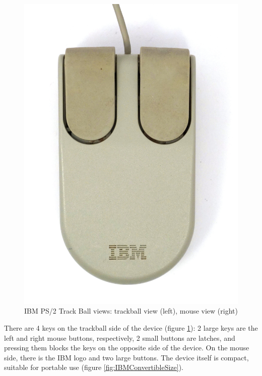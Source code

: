 \documentclass[11pt, a4paper]{article}
\begin{document}
\begin{figure}[h]
    \includegraphics[scale=0.5]{1992_ibm_convertible/bottom_60.jpg}
    \caption{IBM PS/2 Track Ball views: trackball view (left), mouse view (right)}
    \label{fig:IBMConvertibleTopAndBottom}
\end{figure}

There are 4 keys on the trackball side of the device (figure \ref{fig:IBMConvertibleTopAndBottom}): 2 large keys are the left and right mouse buttons, respectively, 2 small buttons are latches, and pressing them blocks the keys on the opposite side of the device. On the mouse side, there is the IBM logo and two large buttons. The device itself is compact, suitable for portable use (figure \ref{fig:IBMConvertibleSize}).
\end{document}
